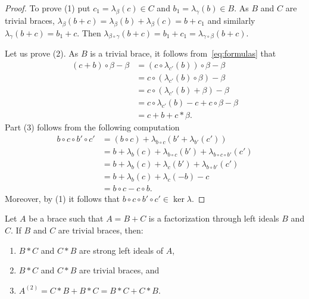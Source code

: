 \begin{proof}
	To prove (1) put $c_1=\lambda_\beta(c)\in C$ and $b_1=\lambda_{\gamma}(b)\in B$. As $B$ and $C$ are trivial braces, $\lambda_\beta(b+c) =\lambda_{\beta}(b)+\lambda_\beta(c)=b+c_1$ and similarly 
	$\lambda_\gamma(b+c)=b_1+c$.
	Then $\lambda_{\beta\circ\gamma}(b+c)=b_1+c_1=\lambda_{\gamma\circ\beta}(b+c)$. 
	
	Let us prove (2). As $B$ is a trivial brace, it follows from~\eqref{eq:formulas} that 
	\begin{align*}
		(c+b)\circ\beta-\beta &= (c\circ\lambda_{c'}(b))\circ\beta-\beta\\
		&=c\circ(\lambda_{c'}(b)\circ\beta)-\beta\\
		&=c\circ(\lambda_{c'}(b)+\beta)-\beta\\
		&=c\circ\lambda_{c'}(b)-c+c\circ\beta-\beta\\
		&=c+b+c*\beta.
	\end{align*}
	Part (3) follows from the following computation
	\begin{align*}
	    b \circ c \circ b' \circ c' &= (b\circ c) +\lambda_{b\circ c} (b' + \lambda_{b'}(c'))\\
	    &=b + \lambda_b(c) + \lambda_{b\circ c}(b') + \lambda_{b \circ c \circ b'}(c')\\
	     &= b+\lambda_{b}(c) + \lambda_{c}(b') + \lambda_{b\circ b'}(c')\\ 
	                                & =b + \lambda_b(c) +\lambda_c(-b) -c\\
	                                & =b \circ c - c \circ b.
	\end{align*}
	Moreover, by (1) it follows that $b \circ c \circ b' \circ c' \in \ker \lambda$.
\end{proof}

\begin{lemma}
\label{lem:hardworkfactoriz}
Let $A$ be a brace such that $A=B+C$ is a factorization through left ideals  $B$ and $C$. If $B$ and $C$ are trivial braces, then: 
\begin{enumerate}
    \item $B*C$ and $C*B$ are strong left ideals of $A$,
    \item $B*C$ and $C*B$ are trivial braces, and 
    \item $A^{(2)} = C*B+B*C=B*C+C*B$.
\end{enumerate}
\end{lemma}


